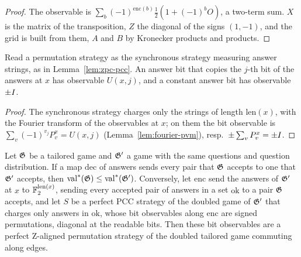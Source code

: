 \begin{proof}
\leanok
The observable is $\sum_b (-1)^{\mathrm{enc}(b)} \frac12(1 + (-1)^b O)$, a two-term sum. $X$ is
the matrix of the transposition, $Z$ the diagonal of the signs $(1, -1)$, and the grid is
built from them, $A$ and $B$ by Kronecker products and products.
\end{proof}

\begin{lemma}
\label{lem:input-answer-bits}
\leanok
Read a permutation strategy as the synchronous strategy measuring answer strings, as in
Lemma~\ref{lem:zpc-pcc}. An answer bit that copies the $j$-th bit of the answers at $x$ has observable
$U(x, j)$, and a constant answer bit has observable $\pm I$.
\end{lemma}

\begin{proof}
\leanok
The synchronous strategy charges only the strings of length $\mathrm{len}(x)$, with the Fourier
transform of the observables at $x$; on them the bit observable is $\sum_v (-1)^{v_j} P^x_v =
U(x, j)$ (Lemma~\ref{lem:fourier-pvm}), resp.\ $\pm \sum_v P^x_v = \pm I$.
\end{proof}

\begin{lemma}
\label{lem:presentation-transport}
\leanok
Let $\mathfrak{G}$ be a tailored game and $\mathfrak{G}'$ a game with the same questions and
question distribution. If a map $\mathrm{dec}$ of answers sends every pair that $\mathfrak{G}$
accepts to one that $\mathfrak{G}'$ accepts, then $\mathrm{val}^*(\mathfrak{G}) \le
\mathrm{val}^*(\mathfrak{G}')$. Conversely, let $\mathrm{enc}$ send the answers of $\mathfrak{G}'$
at $x$ to $\mathbb{F}_2^{\mathrm{len}(x)}$, sending every accepted pair of answers in a set
$\mathrm{ok}$ to a pair $\mathfrak{G}$ accepts, and let $S$ be a perfect PCC strategy of the
doubled game of $\mathfrak{G}'$ that charges only answers in $\mathrm{ok}$, whose bit
observables along $\mathrm{enc}$ are signed permutations, diagonal at the readable bits. Then
these bit observables are a perfect Z-aligned permutation strategy of the doubled tailored
game commuting along edges.
\end{lemma}

